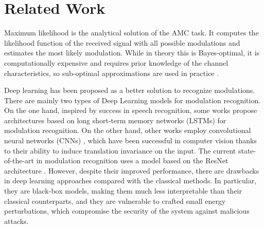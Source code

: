 \documentclass[conference]{IEEEtran}
\begin{document}
\section{Related Work}

Maximum likelihood \cite{huan1995likelihood,dobre2007survey,hameed2009likelihood} is the analytical solution of the AMC task. It computes the likelihood function of the received signal with all possible modulations and estimates the most likely modulation. While in theory this is Bayes-optimal, it is computationally expensive and requires prior knowledge of the channel characteristics, so sub-optimal approximations are used in practice \cite{dobre2007survey,Hameed_Dobre_Popescu_2009}.

Deep learning \cite{goodfellow2016deep} has been proposed as a better solution to recognize modulations. %
There are mainly two types of Deep Learning models for modulation recognition. On the one hand, inspired by success in speech recognition, some works \cite{Rajendran_Meert_Giustiniano_Lenders_Pollin_2018,Guo_Jiang_Wu_Zhou_2020} propose architectures based on long short-term memory networks (LSTMs) \cite{Hochreiter_Schmidhuber_1997} for modulation recognition. On the other hand, other works \cite{OShea_Corgan_Clancy_2016,West_OShea_2017,Sadeghi_Larsson_2019} employ convolutional neural networks (CNNs) \cite{Krizhevsky_Sutskever_Hinton_2017}, which have been successful in computer vision thanks to their ability to induce translation invariance on the input. The current state-of-the-art in modulation recognition \cite{OShea_Roy_Clancy_2018} uses a model based on the ResNet architecture \cite{Szegedy_Ioffe_Vanhoucke_Alemi_2016}. However, despite their improved performance, there are drawbacks in deep learning approaches compared with the classical methods. In particular, they are black-box models, making them much less interpretable than their classical counterparts, and they are vulnerable to crafted small energy perturbations, which compromise the security of the system against malicious attacks.
\end{document}
